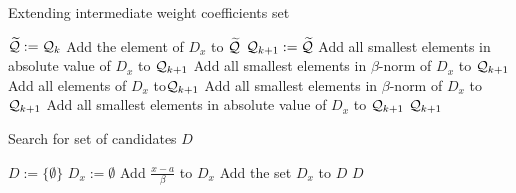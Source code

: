 \begin{algorithm}
  \caption{Extending intermediate weight coefficients set}
    \label{alg:extendWeightCoefSet}
  \begin{algorithmic}[1]
    \STATE $\widetilde{\mathcal{Q}}:=\mathcal{Q}_{k}$
		    	\STATE Add the element of $D_x$ to $\widetilde{\mathcal{Q}}$
			\ENDIF
		\ENDFOR
	\ENDIF
    \STATE $\mathcal{Q}_{k+1}:=\widetilde{\mathcal{Q}}$
	        	\STATE Add all smallest elements in absolute value of $D_x$ to $\mathcal{Q}_{k+1}$
	        	\STATE Add all smallest elements in $\beta$-norm of $D_x$ to $\mathcal{Q}_{k+1}$
	        	\STATE Add all elements of $D_x$ to$\mathcal{Q}_{k+1}$
	        	\STATE Add all smallest elements in $\beta$-norm of $D_x$ to $\mathcal{Q}_{k+1}$
	        	\STATE Add all smallest elements in absolute value of $D_x$ to $\mathcal{Q}_{k+1}$ 
	        \ENDIF
        \ENDIF
    \ENDFOR
    \RETURN $\mathcal{Q}_{k+1}$
  \end{algorithmic}
\end{algorithm}



\begin{algorithm}
  \caption{Search for set of candidates $D$}
    \label{alg:searchCand}
  \begin{algorithmic}[1]
    \STATE $D:=\{\emptyset\}$
     \label{line:replaceBySmaller}
      \STATE $D_x:=\emptyset$
              \STATE Add $\frac{x-a}{\beta}$ to $D_x$
            \ENDIF
      \ENDFOR 
      \STATE Add the set $D_x$ to $D$
  \ENDFOR
  \RETURN $D$
  \end{algorithmic}
\end{algorithm}  
